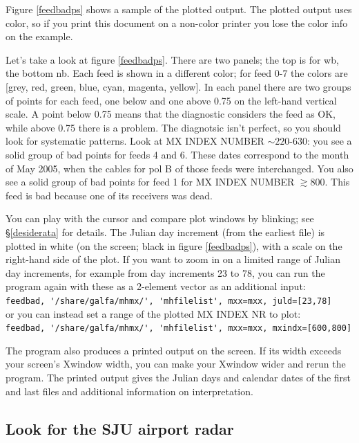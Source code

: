 \documentclass[psfig,preprint]{aastex}
\begin{document}
	Figure \ref{feedbadps} shows a sample of the plotted output.
The plotted output uses color, so if you print this document on a
non-color printer you lose the color info on the example. 

	Let's take a look at figure \ref{feedbadps}. There are two
panels; the top is for wb, the bottom nb. Each feed is
shown in a different color; for feed 0-7 the colors are [grey, red,
green, blue, cyan, magenta, yellow]. In each panel there are two groups
of points for each feed, one below and one above 0.75 on the left-hand
vertical scale. A point below 0.75 means that the diagnostic considers the
feed as OK, while above 0.75 there is a problem. The diagnotsic isn't
perfect, so you should look for systematic patterns. Look at MX INDEX
NUMBER $\sim 220$-$630$: you see a solid group of bad points for feeds 4
and 6. These dates correspond to the month of May 2005, when the cables
for pol B of those feeds were interchanged. You also see a solid group
of bad points for feed 1 for MX INDEX NUMBER $\gtrsim 800$. This feed is
bad because one of its receivers was dead. 

		You can play with the cursor and compare plot windows by
blinking; see \S \ref{desiderata} for details.  The Julian day increment
(from the earliest file) is plotted in
white (on the screen; black in figure \ref{feedbadps}), with a scale 
on the right-hand side of the plot. If you want to
zoom in on a limited range of Julian day increments, for example from
day increments 23 to 78, you can run the program again with these as a
2-element vector as an additional input: \\
\verb$feedbad, '/share/galfa/mhmx/', 'mhfilelist', mxx=mxx, juld=[23,78]$ \\
or you can instead set a range of the plotted MX INDEX NR to plot: \\
\verb$feedbad, '/share/galfa/mhmx/', 'mhfilelist', mxx=mxx, mxindx=[600,800]$ 

	The program also produces a printed output on the screen. If its
width exceeds your screen's Xwindow width, you can make your Xwindow
wider and rerun the program. The printed output gives the Julian days
and calendar dates of the first and last files and additional information
on interpretation. 

\subsection{Look for the SJU airport radar} \label{sjubad}
\end{document}
